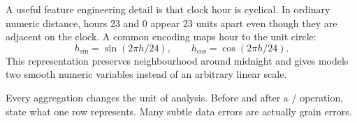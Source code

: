 A useful feature engineering detail is that clock hour is cyclical. In ordinary numeric distance, hours 23 and 0 appear 23 units apart even though they are adjacent on the clock. A common encoding maps hour to the unit circle:
\[
  h_{\sin}=\sin(2\pi h/24), \qquad h_{\cos}=\cos(2\pi h/24).
\]
This representation preserves neighbourhood around midnight and gives models two smooth numeric variables instead of an arbitrary linear scale.

\begin{keyidea}
Every aggregation changes the unit of analysis. Before and after a / operation, state what one row represents. Many subtle data errors are actually grain errors.
\end{keyidea}
